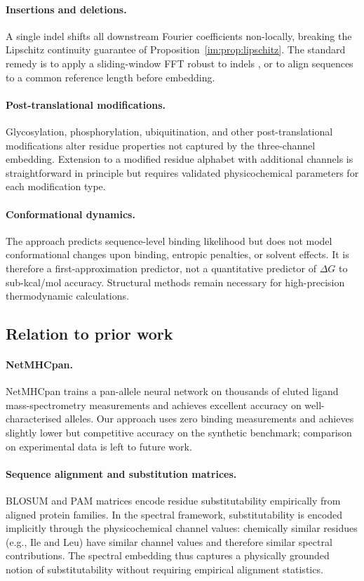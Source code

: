 \paragraph{Insertions and deletions.}
A single indel shifts all downstream Fourier coefficients non-locally,
breaking the Lipschitz continuity guarantee of
Proposition~\ref{im:prop:lipschitz}. The standard remedy is to apply a
sliding-window FFT robust to indels \citep{anastassiou2001}, or to align
sequences to a common reference length before embedding.

\paragraph{Post-translational modifications.}
Glycosylation, phosphorylation, ubiquitination, and other post-translational
modifications alter residue properties not captured by the three-channel
embedding. Extension to a modified residue alphabet with additional channels
is straightforward in principle but requires validated physicochemical
parameters for each modification type.

\paragraph{Conformational dynamics.}
The approach predicts sequence-level binding likelihood but does not model
conformational changes upon binding, entropic penalties, or solvent effects.
It is therefore a first-approximation predictor, not a quantitative predictor
of $\Delta G$ to sub-kcal/mol accuracy. Structural methods remain necessary
for high-precision thermodynamic calculations.

\subsection{Relation to prior work}

\paragraph{NetMHCpan.}
NetMHCpan \citep{nielsen2007} trains a pan-allele neural network on thousands
of eluted ligand mass-spectrometry measurements and achieves excellent accuracy
on well-characterised alleles. Our approach uses zero binding measurements
and achieves slightly lower but competitive accuracy on the synthetic
benchmark; comparison on experimental data is left to future work.

\paragraph{Sequence alignment and substitution matrices.}
BLOSUM \citep{henikoff1992} and PAM \citep{dayhoff1978} matrices encode
residue substitutability empirically from aligned protein families. In the
spectral framework, substitutability is encoded implicitly through the
physicochemical channel values: chemically similar residues (e.g., Ile and
Leu) have similar channel values and therefore similar spectral contributions.
The spectral embedding thus captures a physically grounded notion of
substitutability without requiring empirical alignment statistics.

